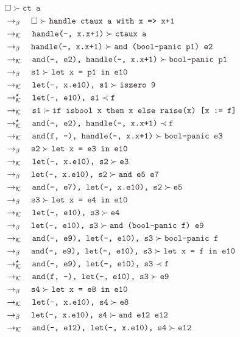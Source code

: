 \documentclass{article}
\newcommand{\tx}[1]{\textcolor{Black} {\texttt{#1}}}
\newcommand{\es}{$\square$}
\newcommand{\pop}[2]{ \tx{#1} \succ \tx{#2}}
\newcommand{\push}[2]{ \tx{#1} \prec \tx{#2}}
\newcommand{\kr}{\rightarrow_{\mathcal{K}} \quad}
\newcommand{\br}{\rightarrow_{\beta} \quad}
\newcommand{\krs}{\rightarrow_{\mathcal{K}}^{\star} \quad}
\begin{document}
\begin{enumerate}
        \begin{align*}
        &\pop{\es}{ct a}\\
        &\br \pop{\es}{handle ctaux a with x => x+1}\\
        &\kr \pop{handle(-, x.x+1)}{ctaux a}\\
        &\br \pop{handle(-, x.x+1)}{and (bool-panic p1) e2}\\
        &\kr \pop{and(-, e2), handle(-, x.x+1)}{bool-panic p1}\\
        &\br \pop{s1}{let x = p1 in e10}\\
        &\kr \pop{let(-, x.e10), s1}{iszero 9}\\
        &\krs \push{let(-, e10), s1}{f}\\
        &\kr \pop{s1}{if isbool x then x else raise(x) [x := f]}\\
        &\krs \push{and(-, e2), handle(-, x.x+1)}{f}\\
        &\kr \pop{and(f, -), handle(-, x.x+1)}{bool-panic e3}\\
        &\br \pop{s2}{let x = e3 in e10}\\
        &\kr \pop{let(-, x.e10), s2}{e3}\\
        &\br \pop{let(-, x.e10), s2}{and e5 e7}\\
        &\kr \pop{and(-, e7), let(-, x.e10), s2}{e5}\\
        &\br \pop{s3}{let x = e4 in e10}\\
        &\kr \pop{let(-, e10), s3}{e4}\\
        &\br \pop{let(-, e10), s3}{and (bool-panic f) e9}\\
        &\kr \pop{and(-, e9), let(-, e10), s3}{bool-panic f}\\
        &\br \pop{and(-, e9), let(-, e10), s3}{let x = f in e10}\\
        &\krs \push{and(-, e9), let(-, e10), s3}{f}\\
        &\kr \pop{and(f, -), let(-, e10), s3}{e9}\\
        &\br \pop{s4}{let x = e8 in e10}\\
        &\kr \pop{let(-, x.e10), s4}{e8}\\
        &\br \pop{let(-, x.e10), s4}{and e12 e12}\\
        &\kr \pop{and(-, e12), let(-, x.e10), s4}{e12}\\

\end{align*}
\end{enumerate}
\end{document}
